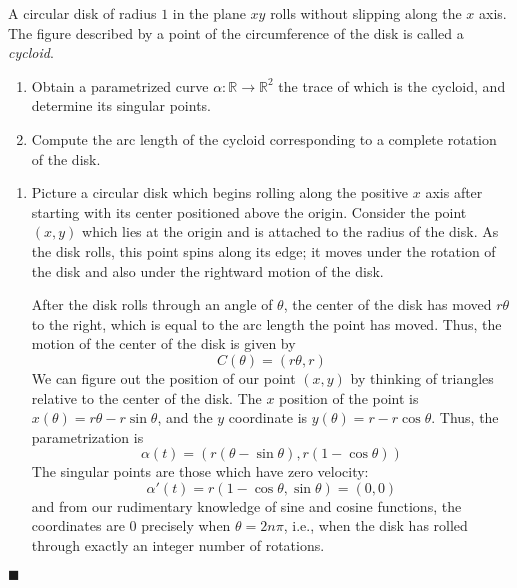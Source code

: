 \documentclass[12pt]{article}
\renewcommand{\qed}{\hfill$\blacksquare$}
\renewenvironment{proof}{\begin{addmargin}[1em]{0em}\begin{newproof}}{\end{newproof}\end{addmargin}\qed}
\newenvironment{problem}[2][Exercise]{\begin{trivlist}
\item[\hskip \labelsep {\bfseries #1}\hskip \labelsep {\bfseries #2.}]}{\end{trivlist}}
\begin{document}
\begin{problem}{1.3.2}
A circular disk of radius $1$ in the plane $xy$ rolls without slipping along the $x$ axis. The figure described by a point of the circumference of the disk is called a \textit{cycloid}.
\begin{enumerate}[label=(\alph*)]
	\item Obtain a parametrized curve $\alpha: \mathbb{R}\rightarrow \mathbb{R}^2$ the trace of which is the cycloid, and determine its singular points.
	\item Compute the arc length of the cycloid corresponding to a complete rotation of the disk.
\end{enumerate}
\end{problem}
\begin{proof}
\begin{enumerate}[label=(\alph*)]
	\item Picture a circular disk which begins rolling along the positive $x$ axis after starting with its center positioned above the origin. Consider the point $\left(x,y\right)$ which lies at the origin and is attached to the radius of the disk. As the disk rolls, this point spins along its edge; it moves under the rotation of the disk and also under the rightward motion of the disk.

After the disk rolls through an angle of $\theta$, the center of the disk has moved $r\theta$ to the right, which is equal to the arc length the point has moved. Thus, the motion of the center of the disk is given by \[ C\left(\theta\right) = \left(r\theta, r\right) \] We can figure out the position of our point $\left(x,y\right)$ by thinking of triangles relative to the center of the disk. The $x$ position of the point is $x\left(\theta\right) = r\theta - r \sin \theta$, and the $y$ coordinate is $y\left(\theta\right) = r - r\cos \theta $. Thus, the parametrization is \[ \alpha\left(t\right) = \left( r\left(\theta - \sin \theta \right), r\left(1-\cos \theta \right) \right) \]
The singular points are those which have zero velocity:
\[ \alpha'\left(t\right) = r\left(1-\cos \theta, \sin\theta \right) = \left(0,0\right)\] and from our rudimentary knowledge of sine and cosine functions, the coordinates are $0$ precisely when $\theta = 2n\pi$, i.e., when the disk has rolled through exactly an integer number of rotations.


\end{enumerate}
\end{proof}
\end{document}
